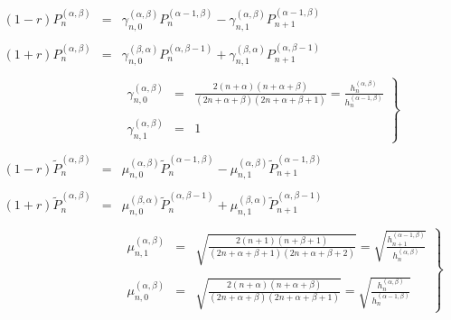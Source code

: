 \begin{eqnarray}
  (1 - r) P_n^{(\alpha, \beta)} & = & \gamma_{n, 0}^{(\alpha, \beta)}
  P_n^{(\alpha - 1, \beta)} - \gamma_{n, 1}^{(\alpha, \beta)} P_{n +
  1}^{(\alpha - 1, \beta)}  \label{eq:jacform-ad}\\
  &  &  \nonumber\\
  (1 + r) P_n^{(\alpha, \beta)} & = & \gamma_{n, 0}^{(\beta, \alpha)}
  P_n^{(\alpha, \beta - 1)} + \gamma_{n, 1}^{(\beta, \alpha)} P_{n +
  1}^{(\alpha, \beta - 1)}  \label{eq:jacform-bd}\\
  &  &  \nonumber\\
  &  & \left. \begin{array}{lll}
    \gamma_{n, 0}^{(\alpha, \beta)} & = & \frac{2 (n + \alpha) (n + \alpha +
    \beta)}{(2 n + \alpha + \beta) (2 n + \alpha + \beta + 1)} =
    \frac{h_n^{(\alpha, \beta)}}{h_n^{(\alpha - 1, \beta)}}\\
    &  & \\
    \gamma_{n, 1}^{(\alpha, \beta)} & = & 1
  \end{array} \right\}  \label{eq:jacform-gammadef}\\
  &  &  \nonumber\\
  (1 - r) \tilde{P}_n^{(\alpha, \beta)} & = & \mu^{(\alpha, \beta)}_{n, 0} 
  \tilde{P}_n^{(\alpha - 1, \beta)} - \mu_{n, 1}^{(\alpha, \beta)} 
  \tilde{P}_{n + 1}^{(\alpha - 1, \beta)}  \label{eq:jacform-adn}\\
  &  &  \nonumber\\
  (1 + r) \tilde{P}_n^{(\alpha, \beta)} & = & \mu_{n, 0}^{(\beta, \alpha)}
  \tilde{P}_n^{(\alpha, \beta - 1)} + \mu^{(\beta, \alpha)}_{n, 1}
  \tilde{P}_{n + 1}^{(\alpha, \beta - 1)}  \label{eq:jacform-bdn}\\
  &  &  \nonumber\\
  &  & \left. \begin{array}{lll}
    \mu^{(\alpha, \beta)}_{n, 1} & = & \sqrt{\frac{2 (n + 1) (n + \beta +
    1)}{(2 n + \alpha + \beta + 1) (2 n + \alpha + \beta + 2)}} =
    \sqrt{\frac{h_{n + 1}^{(\alpha - 1, \beta)}}{h_n^{(\alpha, \beta)}}}\\
    &  & \\
    \mu^{(\alpha, \beta)}_{n, 0} & = & \sqrt{\frac{2 (n + \alpha) (n + \alpha
    + \beta)}{(2 n + \alpha + \beta) (2 n + \alpha + \beta + 1)}} =
    \sqrt{\frac{h_n^{(\alpha, \beta)}}{h_n^{(\alpha - 1, \beta)}}}
  \end{array} \right\}  \label{eq:jacform-gammatildedef}\\
\end{eqnarray}
